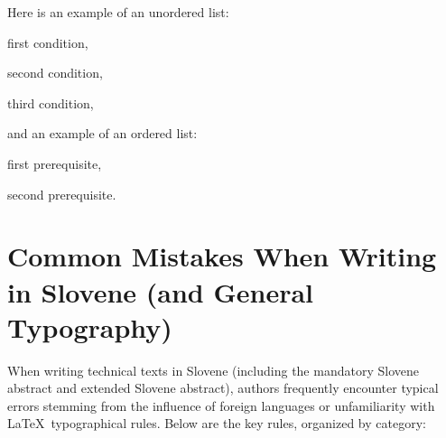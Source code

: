 \documentclass[9pt]{style/friteza}
\begin{document}
Here is an example of an unordered list:
\begin{compactitemize}
 \item first condition,
 \item second condition,
 \item third condition,
\end{compactitemize}
and an example of an ordered list:
\begin{compactenumerate}[label=\alph*)]
\item first prerequisite,
\item second prerequisite.
\end{compactenumerate}

\section{Common Mistakes When Writing in Slovene (and General Typography)}
\label{sec:slo}

When writing technical texts in Slovene (including the mandatory Slovene abstract and extended Slovene abstract), authors frequently encounter typical errors stemming from the influence of foreign languages or unfamiliarity with \LaTeX\ typographical rules. Below are the key rules, organized by category:
\end{document}
